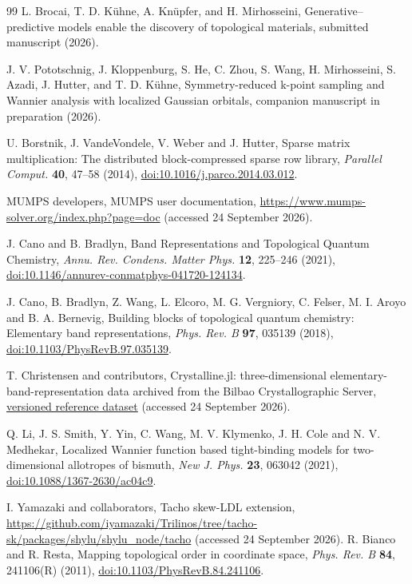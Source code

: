 \begin{thebibliography}{99}
L. Brocai, T. D. K\"uhne, A. Kn\"upfer, and H. Mirhosseini,
Generative--predictive models enable the discovery of topological materials,
submitted manuscript (2026).

J. V. Pototschnig, J. Kloppenburg, S. He, C. Zhou, S. Wang,
H. Mirhosseini, S. Azadi, J. Hutter, and T. D. K\"uhne,
Symmetry-reduced k-point sampling and Wannier analysis with localized
Gaussian orbitals, companion manuscript in preparation (2026).

U. Borstnik, J. VandeVondele, V. Weber and J. Hutter, Sparse matrix
multiplication: The distributed block-compressed sparse row library,
\emph{Parallel Comput.} \textbf{40}, 47--58 (2014),
\href{https://doi.org/10.1016/j.parco.2014.03.012}{doi:10.1016/j.parco.2014.03.012}.

MUMPS developers, MUMPS user documentation,
\url{https://www.mumps-solver.org/index.php?page=doc}
(accessed 24 September 2026).

J. Cano and B. Bradlyn, Band Representations and Topological Quantum Chemistry,
\emph{Annu. Rev. Condens. Matter Phys.} \textbf{12}, 225--246 (2021),
\href{https://doi.org/10.1146/annurev-conmatphys-041720-124134}{doi:10.1146/annurev-conmatphys-041720-124134}.

J. Cano, B. Bradlyn, Z. Wang, L. Elcoro, M. G. Vergniory, C. Felser,
M. I. Aroyo and B. A. Bernevig,
Building blocks of topological quantum chemistry: Elementary band representations,
\emph{Phys. Rev. B} \textbf{97}, 035139 (2018),
\href{https://doi.org/10.1103/PhysRevB.97.035139}{doi:10.1103/PhysRevB.97.035139}.

T. Christensen and contributors, Crystalline.jl: three-dimensional
elementary-band-representation data archived from the Bilbao Crystallographic Server,
\href{https://github.com/thchr/Crystalline.jl/tree/9cfb644a1a4cc1c7baec457b321885459bb98bd1/data/bandreps/3d}{versioned reference dataset}
(accessed 24 September 2026).

Q. Li, J. S. Smith, Y. Yin, C. Wang, M. V. Klymenko, J. H. Cole
and N. V. Medhekar, Localized Wannier function based tight-binding
models for two-dimensional allotropes of bismuth,
\emph{New J. Phys.} \textbf{23}, 063042 (2021),
\href{https://doi.org/10.1088/1367-2630/ac04c9}{doi:10.1088/1367-2630/ac04c9}.

I. Yamazaki and collaborators, Tacho skew-LDL extension,
\url{https://github.com/iyamazaki/Trilinos/tree/tacho-sk/packages/shylu/shylu_node/tacho}
(accessed 24 September 2026).
R. Bianco and R. Resta, Mapping topological order in coordinate space,
\emph{Phys. Rev. B} \textbf{84}, 241106(R) (2011),
\href{https://doi.org/10.1103/PhysRevB.84.241106}{doi:10.1103/PhysRevB.84.241106}.


\end{thebibliography}
